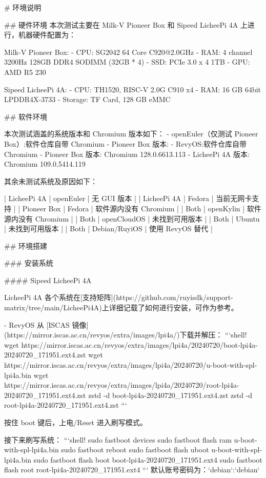 \documentclass{article}
\begin{document}
\begin{markdown}
# 环境说明

## 硬件环境
本次测试主要在 Milk-V Pioneer Box 和 Sipeed LicheePi 4A 上进行，机器硬件配置为：

Milk-V Pioneer Box:
- CPU: SG2042 64 Core C920@2.0GHz
- RAM: 4 channel 3200Hz 128GB DDR4 SODIMM (32GB * 4)
- SSD: PCIe 3.0 x 4 1TB
- GPU: AMD R5 230

Sipeed LicheePi 4A:
- CPU: TH1520, RISC-V 2.0G C910 x4
- RAM: 16 GB 64bit LPDDR4X-3733
- Storage: TF Card, 128 GB eMMC

## 软件环境

本次测试涵盖的系统版本和 Chromium 版本如下：
- openEuler（仅测试 Pioneer Box）:软件仓库自带 Chromium 
  - Pioneer Box 版本: 
- RevyOS:软件仓库自带 Chromium
  - Pioneer Box 版本: Chromium 128.0.6613.113
  - LicheePi 4A 版本: Chromium 109.0.5414.119
  
其余未测试系统及原因如下：

| LicheePi 4A | openEuler     | 无 GUI 版本           |
| LicheePi 4A | Fedora        | 当前无网卡支持        |
| Pioneer Box | Fedora        | 软件源内没有 Chromium |
| Both        | openKylin     | 软件源内没有 Chromium |
| Both        | openCloudOS   | 未找到可用版本        |
| Both        | Ubuntu        | 未找到可用版本        |
| Both        | Debian/RuyiOS | 使用 RevyOS 替代      |

## 环境搭建

### 安装系统

#### Sipeed LicheePi 4A

LicheePi 4A 各个系统在[支持矩阵](https://github.com/ruyisdk/support-matrix/tree/main/LicheePi4A)上详细记载了如何进行安装，可作为参考。

- RevyOS
从 [ISCAS 镜像](https://mirror.iscas.ac.cn/revyos/extra/images/lpi4a/)下载并解压：
```shell!
wget https://mirror.iscas.ac.cn/revyos/extra/images/lpi4a/20240720/boot-lpi4a-20240720_171951.ext4.zst
wget https://mirror.iscas.ac.cn/revyos/extra/images/lpi4a/20240720/u-boot-with-spl-lpi4a.bin
wget https://mirror.iscas.ac.cn/revyos/extra/images/lpi4a/20240720/root-lpi4a-20240720_171951.ext4.zst
zstd -d boot-lpi4a-20240720_171951.ext4.zst
zstd -d root-lpi4a-20240720_171951.ext4.zst
```

按住 boot 键后，上电/Reset 进入刷写模式。

接下来刷写系统：
```shell!
sudo fastboot devices
sudo fastboot flash ram u-boot-with-spl-lpi4a.bin 
sudo fastboot reboot
sudo fastboot flash uboot u-boot-with-spl-lpi4a.bin
sudo fastboot flash boot boot-lpi4a-20240720_171951.ext4
sudo fastboot flash root root-lpi4a-20240720_171951.ext4
```
默认账号密码为：`debian`:`debian`


\end{markdown}
\end{document}
